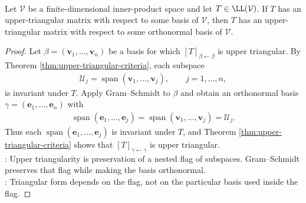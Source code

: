 \begin{corollary} \label{cor:upper-triangular-orthonormal-basis} \\
Let $\mathcal{V}$ be a finite-dimensional inner-product space and let $T\in\LL(\mathcal{V})$. If $T$ has an upper-triangular matrix with respect to some basis of $\mathcal{V}$, then $T$ has an upper-triangular matrix with respect to some orthonormal basis of $\mathcal{V}$.
\begin{proof}
Let $\beta=(\mathbf{v}_1,\ldots,\mathbf{v}_n)$ be a basis for which $[T]_{\beta\leftarrow\beta}$ is upper triangular. By Theorem \ref{thm:upper-triangular-criteria}, each subspace
\begin{align}
\mathcal{U}_j=\operatorname{span}(\mathbf{v}_1,\ldots,\mathbf{v}_j),\qquad j=1,\ldots,n,
\nonumber
\end{align}
is invariant under $T$. Apply Gram--Schmidt to $\beta$ and obtain an orthonormal basis $\gamma=(\mathbf{e}_1,\ldots,\mathbf{e}_n)$ with
\begin{align}
\operatorname{span}(\mathbf{e}_1,\ldots,\mathbf{e}_j)=\operatorname{span}(\mathbf{v}_1,\ldots,\mathbf{v}_j)=\mathcal{U}_j.
\nonumber
\end{align}
Thus each $\operatorname{span}(\mathbf{e}_1,\ldots,\mathbf{e}_j)$ is invariant under $T$, and Theorem \ref{thm:upper-triangular-criteria} shows that $[T]_{\gamma\leftarrow\gamma}$ is upper triangular.\\
: Upper triangularity is preservation of a nested flag of subspaces. Gram--Schmidt preserves that flag while making the basis orthonormal.\\
: Triangular form depends on the flag, not on the particular basis used inside the flag.
\end{proof}
\end{corollary}

